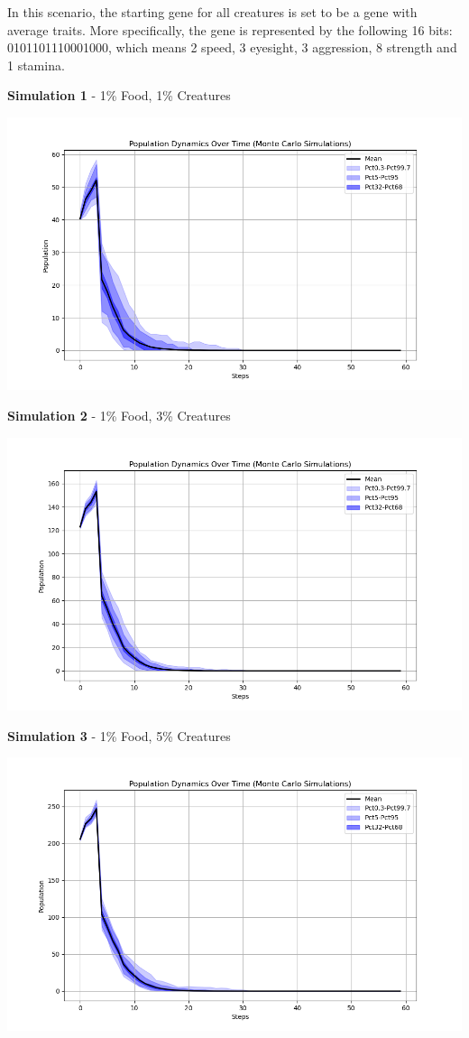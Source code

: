 \documentclass{article}
\begin{document}
In this scenario, the starting gene for all creatures is set to be a gene with average traits. More specifically, the gene is represented by the following 16 bits: 0101101110001000, which means 2 speed, 3 eyesight, 3 aggression, 8 strength and 1 stamina.

\textbf{Simulation 1} - 1\% Food, 1\% Creatures
\begin{center}
    \includegraphics[scale=0.5]{tests/1_population_dynamics.png}
\end{center}
\textbf{Simulation 2} - 1\% Food, 3\% Creatures
\begin{center}
    \includegraphics[scale=0.5]{tests/2_population_dynamics.png}
\end{center}
\textbf{Simulation 3} - 1\% Food, 5\% Creatures
\begin{center}
    \includegraphics[scale=0.5]{tests/3_population_dynamics.png}
\end{center}
\end{document}
